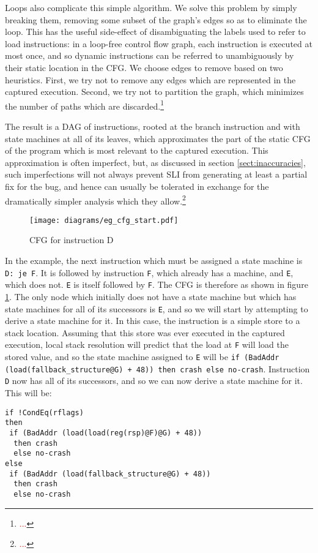 \documentclass[10pt,twocolumn,preprint,natbib,authoryear]{sigplanconf}
\newcommand{\editorial}[1]{\textcolor{red}{\footnote{\textcolor{red}{#1}}}}
\begin{document}
Loops also complicate this simple algorithm.  We solve this problem by
simply breaking them, removing some subset of the graph's edges so as
to eliminate the loop.  This has the useful side-effect of
disambiguating the labels used to refer to load instructions: in a
loop-free control flow graph, each instruction is executed at most
once, and so dynamic instructions can be referred to unambiguously by
their static location in the CFG.  We choose edges to remove based on
two heuristics.  First, we try not to remove any edges which are
represented in the captured execution.  Second, we try not to
partition the graph, which minimizes the number of paths which are
discarded.\editorial{...}

The result is a DAG of instructions, rooted at the branch instruction
and with state machines at all of its leaves, which approximates the
part of the static CFG of the program which is most relevant to the
captured execution.  This approximation is often imperfect, but, as
discussed in section \ref{sect:inaccuracies}, such imperfections will
not always prevent SLI from generating at least a partial fix for the
bug, and hence can usually be tolerated in exchange for the
dramatically simpler analysis which they allow.\editorial{...}

\begin{figure}
\texttt{[image: diagrams/eg\_cfg\_start.pdf]}
\caption{CFG for instruction D}
\label{fig:eg_cfg}
\end{figure}

In the example, the next instruction which must be assigned a state
machine is \verb|D: je F|.  It is followed by instruction \verb|F|,
which already has a machine, and \verb|E|, which does not.  \verb|E|
is itself followed by \verb|F|.  The CFG is therefore as shown in
figure \ref{fig:eg_cfg}.  The only node which initially does not have
a state machine but which has state machines for all of its successors
is \verb|E|, and so we will start by attempting to derive a state
machine for it.  In this case, the instruction is a simple store to a
stack location.  Assuming that this store was ever executed in the
captured execution, local stack resolution will predict that the load
at \verb|F| will load the stored value, and so the state machine
assigned to \verb|E| will be
\verb|if (BadAddr (load(fallback_structure@G) + 48)) then crash else no-crash|.
Instruction \verb|D| now has all of its successors, and so we can
now derive a state machine for it.  This will be:

\begin{verbatim}
if !CondEq(rflags)
then
 if (BadAddr (load(load(reg(rsp)@F)@G) + 48))
  then crash
  else no-crash
else
 if (BadAddr (load(fallback_structure@G) + 48))
  then crash
  else no-crash
\end{verbatim}
\end{document}
